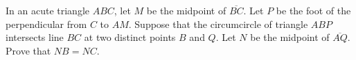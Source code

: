 In an acute triangle $ABC$, let $M$ be the midpoint of $\overline{BC}$. Let $P$ be the foot of the perpendicular from $C$ to $AM$. Suppose that the circumcircle of triangle $ABP$ intersects line $BC$ at two distinct points $B$ and $Q$. Let $N$ be the midpoint of $\overline{AQ}$. Prove that $NB=NC$.
